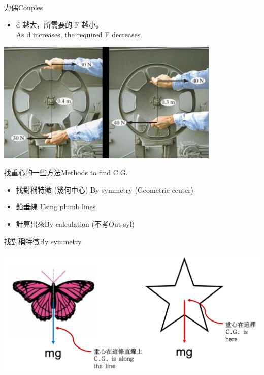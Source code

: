 \documentclass[beamer=true]{standalone}
\begin{document}
\begin{frame}{力偶Couples}
    \begin{itemize}
        \item d 越大，所需要的 F 越小。\\As d increases, the required F decreases.
    \end{itemize}\bigskip
    {\par\centering
        \includegraphics[width=0.8\textwidth]{assets/347900c8.png}
        \par}
\end{frame}


\begin{frame}{找重心的一些方法Methods to find C.G.}
    \begin{itemize}
        \item 找對稱特徵 (幾何中心) By symmetry (Geometric center)
        \item 鉛垂線 Using plumb lines
        \item 計算出來By calculation (不考Out-syl)
    \end{itemize}

\end{frame}
\begin{frame}{找對稱特徵By symmetry}
    \par{\par\centering
        \includegraphics[width=\textwidth]{assets/78bde2e5.png}
        \par}
\end{frame}
\end{document}

